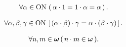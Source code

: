 	\begin{screen}
		\begin{thm}[$1$を掛けても変わらない]
			\begin{align}
				\forall \alpha \in \mathrm{ON}\, \left(\, \alpha \cdot 1 = 1 \cdot \alpha = \alpha\, \right).
			\end{align}
		\end{thm}
	\end{screen}
	
	\begin{screen}
		\begin{thm}[乗法は結合的]
			\begin{align}
				\forall \alpha,\beta,\gamma \in \mathrm{ON}\, 
				\left[\, (\alpha \cdot \beta) \cdot \gamma = \alpha \cdot (\beta \cdot \gamma)\, \right].
			\end{align}
		\end{thm}
	\end{screen}
	
	\begin{screen}
		\begin{thm}[自然数の積は自然数]\label{thm:product_of_natural_numbers_is_a_natural_number}
			\begin{align}
				\forall n, m \in {\boldsymbol \omega}\, (\, n \cdot m \in {\boldsymbol \omega}\, ).
			\end{align}
		\end{thm}
	\end{screen}
